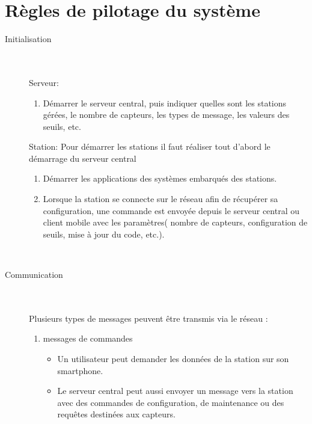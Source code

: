 \section{Règles de pilotage du système}

\begin{description}

\item[Initialisation]\hfill\\
	\\Serveur:
	\begin{enumerate}
	\item Démarrer le serveur central, puis indiquer quelles sont les stations 
    gérées, le nombre de capteurs, les types de message, les valeurs des seuils, etc.\\
	\end{enumerate}
	Station: 
	Pour démarrer les stations il faut réaliser tout d'abord le démarrage du serveur central
	\begin{enumerate}
	\item Démarrer les applications des systèmes embarqués des stations.
	\item Lorsque la station se connecte sur le réseau afin de récupérer sa 
    configuration, une commande est envoyée depuis le serveur central ou client 
    mobile avec les paramètres( nombre de capteurs, configuration de seuils, 
    mise à jour du code, etc.).
	\end{enumerate}
\hfill\\
\item [Communication]\hfill\\
	\\Plusieurs types de messages peuvent être transmis via le réseau :\\
	\begin{enumerate}
	\item messages de commandes \\
		\begin{itemize}
		\item Un utilisateur peut demander les données de la station sur son 
        smartphone.\\
		\item Le serveur central peut aussi envoyer un message vers la station 
        avec des commandes de configuration, de maintenance ou des requêtes 
        destinées aux capteurs.\\
		\end{itemize}
	

\end{enumerate}
\end{description}
